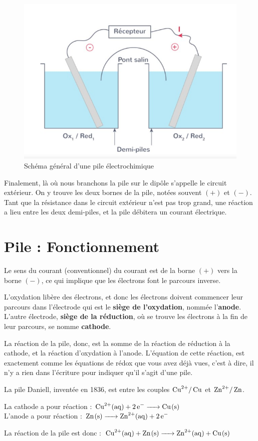 \documentclass[11pt,a4paper]{article}
\begin{document}
\begin{figure}[h]
    \centering
    \includegraphics[width=0.7\linewidth]{imgs/c2bis/pile1.jpg}
    \caption{Schéma général d'une pile électrochimique}
\end{figure}

Finalement, là où nous branchons la pile sur le dipôle s'appelle le circuit extérieur. On y trouve les deux bornes de la pile, notées souvent $(+)$ et $(-)$. Tant que la résistance dans le circuit extérieur n'est pas trop grand, une réaction a lieu entre les deux demi-piles, et la pile débitera un courant électrique.

\section{Pile : Fonctionnement}

Le sens du courant (conventionnel) du courant est de la borne $(+)$ vers la borne $(-)$, ce qui implique que les électrons font le parcours inverse. 

L'oxydation libère des électrons, et donc les électrons doivent commencer leur parcours dans l'électrode qui est le \textbf{siège de l'oxydation}, nommée l'\textbf{anode}. L'autre électrode, \textbf{siège de la réduction}, où se trouve les électrons à la fin de leur parcours, se nomme \textbf{cathode}. 

La réaction de la pile, donc, est la somme de la réaction de réduction à la cathode, et la réaction d'oxydation à l'anode. L'équation de cette réaction, est exactement comme les équations de rédox que vous avez déjà vues, c'est à dire, il n'y a rien dans l'écriture pour indiquer qu'il s'agit d'une pile. 

\begin{eg}
La pile Daniell, inventée en 1836, est entre les couples $\ce{Cu^2+/ Cu}$ et $\ce{Zn^2+/ Zn}$. 

La cathode a pour réaction : $\ce{Cu^2+_(aq) + 2e- -> Cu_(s)} $ \\
L'anode a pour réaction : $\ce{Zn_(s) -> Zn^2+_(aq) + 2e-} $

La réaction de la pile est donc : $\ce{Cu^2+_(aq) + Zn_(s) -> Zn^2+_(aq) + Cu_(s)} $
\end{eg}
\end{document}
